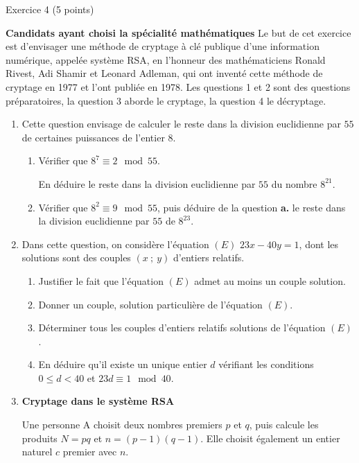 
\begin{h2}Exercice 4 (5 points)\end{h2}
\textbf{Candidats ayant choisi la spécialité \og mathématiques \fg{}}
\medskip
Le but de cet exercice est d'envisager une méthode de cryptage à clé publique d'une information
numérique, appelée système RSA, en l'honneur des mathématiciens Ronald Rivest, Adi Shamir et
Leonard Adleman, qui ont inventé cette méthode de cryptage en 1977 et l'ont publiée en 1978.
\smallskip
Les questions 1 et 2 sont des questions préparatoires, la question 3 aborde le cryptage, la question 4
le décryptage.
\bigskip
\begin{enumerate}
     \item Cette question envisage de calculer le reste dans la division euclidienne par $55$ de certaines
     puissances de l'entier $8$.
     \begin{enumerate}[label=\alph*.]
          \item Vérifier que $8^7 \equiv 2 \mod 55$.
          \par
          En déduire le reste dans la division euclidienne par $55$ du nombre $8^{21}$.
          \item Vérifier que $8^2 \equiv 9 \mod 55$, puis déduire de la question \textbf{a.} le reste dans la division
          euclidienne par $55$ de $8^{23}$.
     \end{enumerate}
     \item  Dans cette question, on considère l'équation $(E)$\: $23 x - 40 y = 1$, dont les solutions sont des
     couples $(x~;~y)$ d'entiers relatifs.
     \begin{enumerate}[label=\alph*.]
          \item Justifier le fait que l'équation $(E)$ admet au moins un couple solution.
          \item  Donner un couple, solution particulière de l'équation $(E)$.
          \item  Déterminer tous les couples d'entiers relatifs solutions de l'équation $(E)$.
          \item  En déduire qu'il existe un unique entier $d$ vérifiant les conditions $0 \leqslant d < 40$ et
          $23 d \equiv  1 \mod 40$.
     \end{enumerate}
     \item  \textbf{Cryptage dans le système RSA}
     \par
     Une personne A choisit deux nombres premiers $p$ et $q$, puis calcule les produits $N = p q$ et
     $n = (p - 1)(q - 1)$. Elle choisit également un entier naturel $c$ premier avec $n$.

\end{enumerate}
